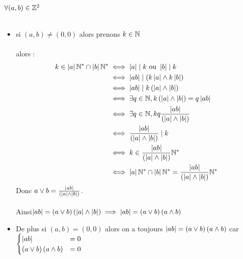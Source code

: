 \begin{dem}
	\(\forall (a,b) \in \mathbb{Z}^2\)\\~\\
	\begin{itemize}
		\item si \((a,b)\neq(0,0)\) alors prenons \(k \in \mathbb{N}\) \\~\\
		      alors :
		      \begin{align*}
			      k \in \left\lvert a\right\rvert\mathbb{N}^*\cap\left\lvert b\right\rvert\mathbb{N}^* & \iff \left\lvert a\right\rvert\mid k \text{ ou } \left\lvert b\right\rvert\mid k                                   \\
			                                       & \iff \left\lvert ab\right\rvert\mid \left(k\left\lvert a\right\rvert\wedge k \left\lvert b\right\rvert\right)                                \\
			                                       & \iff \left\lvert ab\right\rvert \mid k \left(\left\lvert a\right\rvert\wedge \left\lvert b\right\rvert\right)                                \\
			                                       & \iff \exists q\in \mathbb{N},k \left(\left\lvert a\right\rvert\wedge \left\lvert b\right\rvert\right) = q\left\lvert ab\right\rvert                     \\
			                                       & \iff \exists q\in \mathbb{N},k q\frac{\left\lvert ab\right\rvert}{\left(\left\lvert a\right\rvert\wedge \left\lvert b\right\rvert\right)}               \\
			                                       & \iff \frac{\left\lvert ab\right\rvert}{\left(\left\lvert a\right\rvert\wedge \left\lvert b\right\rvert\right)} \mid k                        \\
			                                       & \iff k \in \frac{\left\lvert ab\right\rvert}{\left(\left\lvert a\right\rvert\wedge \left\lvert b\right\rvert\right)} \mathbb{N}^*                        \\
			                                       & \iff \left\lvert a\right\rvert\mathbb{N}^*\cap\left\lvert b\right\rvert\mathbb{N}^* = \frac{\left\lvert ab\right\rvert}{\left(\left\lvert a\right\rvert\wedge \left\lvert b\right\rvert\right)} \mathbb{N}^*
		      \end{align*}
		      Donc \(a\vee b = \frac{\left\lvert ab\right\rvert}{\left(\left\lvert a\right\rvert\wedge \left\lvert b\right\rvert\right)}\).\\~\\
		      Ainsi\(\left\lvert ab\right\rvert =\left(a \vee b\right)\left(\left\lvert a\right\rvert\wedge \left\lvert b\right\rvert\right) \implies \left\lvert ab\right\rvert =\left(a \vee b\right)\left(a\wedge b\right)\)
		\item De plus si \((a,b) = (0,0)\) alors on a toujours \(\left\lvert ab\right\rvert =\left(a \vee b\right)\left(a\wedge b\right)\) car \(\begin{cases}
			      \left\lvert ab\right\rvert                          & = 0 \\
			      \left(a \vee b\right)\left(a\wedge b\right) & =0
		      \end{cases}\)
	\end{itemize}
\end{dem}

